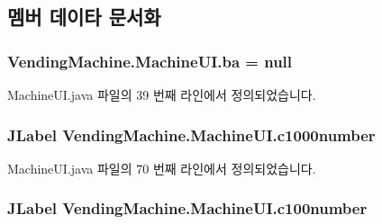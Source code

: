 \subsection{멤버 데이타 문서화}
\subsubsection[{\texorpdfstring{ba}{ba}}]{ Vending\+Machine.\+Machine\+U\+I.\+ba = null\hspace{0.3cm}{\ttfamily [private]}}\hypertarget{class_vending_machine_1_1_machine_u_i_ad8c40fda136d40c4b94b3ba22588bebf}{}\label{class_vending_machine_1_1_machine_u_i_ad8c40fda136d40c4b94b3ba22588bebf}


Machine\+U\+I.\+java 파일의 39 번째 라인에서 정의되었습니다.

\subsubsection[{\texorpdfstring{c1000number}{c1000number}}]{\setlength{\rightskip}{0pt plus 5cm}J\+Label Vending\+Machine.\+Machine\+U\+I.\+c1000number\hspace{0.3cm}{\ttfamily [private]}}\hypertarget{class_vending_machine_1_1_machine_u_i_a019654970035375965815c2c6bf4fc71}{}\label{class_vending_machine_1_1_machine_u_i_a019654970035375965815c2c6bf4fc71}


Machine\+U\+I.\+java 파일의 70 번째 라인에서 정의되었습니다.

\subsubsection[{\texorpdfstring{c100number}{c100number}}]{\setlength{\rightskip}{0pt plus 5cm}J\+Label Vending\+Machine.\+Machine\+U\+I.\+c100number\hspace{0.3cm}{\ttfamily [private]}}\hypertarget{class_vending_machine_1_1_machine_u_i_a3541b20a550888418c19ed32a0d7ac10}{}\label{class_vending_machine_1_1_machine_u_i_a3541b20a550888418c19ed32a0d7ac10}


